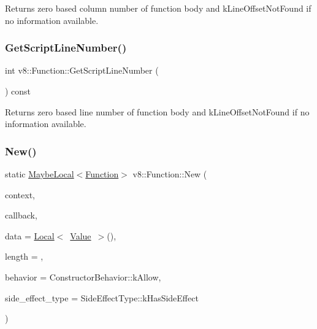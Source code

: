 Returns zero based column number of function body and k\+Line\+Offset\+Not\+Found if no information available. \mbox{\label{classv8_1_1Function_a616f966e538ec32182acd4acb7ee70bc}} 
\subsubsection{\texorpdfstring{Get\+Script\+Line\+Number()}{GetScriptLineNumber()}}
{\footnotesize\ttfamily int v8\+::\+Function\+::\+Get\+Script\+Line\+Number (\begin{DoxyParamCaption}{ }\end{DoxyParamCaption}) const}

Returns zero based line number of function body and k\+Line\+Offset\+Not\+Found if no information available. \mbox{\label{classv8_1_1Function_afc51cb2669c3f8b6035c2a7f813d0040}} 
\subsubsection{\texorpdfstring{New()}{New()}}
{\footnotesize\ttfamily static \mbox{\hyperlink{classv8_1_1MaybeLocal}{Maybe\+Local}}$<$\mbox{\hyperlink{classv8_1_1Function}{Function}}$>$ v8\+::\+Function\+::\+New (\begin{DoxyParamCaption}\item[{\mbox{\hyperlink{classv8_1_1Local}{Local}}$<$ \mbox{\hyperlink{classv8_1_1Context}{Context}} $>$}]{context,  }\item[{Function\+Callback}]{callback,  }\item[{\mbox{\hyperlink{classv8_1_1Local}{Local}}$<$ \mbox{\hyperlink{classv8_1_1Value}{Value}} $>$}]{data = {\ttfamily \mbox{\hyperlink{classv8_1_1Local}{Local}}$<$~\mbox{\hyperlink{classv8_1_1Value}{Value}}~$>$()},  }\item[{int}]{length = {},  }\item[{Constructor\+Behavior}]{behavior = {\ttfamily ConstructorBehavior\+:\+:kAllow},  }\item[{\mbox{\hyperlink{namespacev8_a29711319c2b9fc7716d65faee2f7b9cb}{Side\+Effect\+Type}}}]{side\+\_\+effect\+\_\+type = {\ttfamily SideEffectType\+:\+:kHasSideEffect} }\end{DoxyParamCaption})\hspace{0.3cm}{\ttfamily [static]}}

